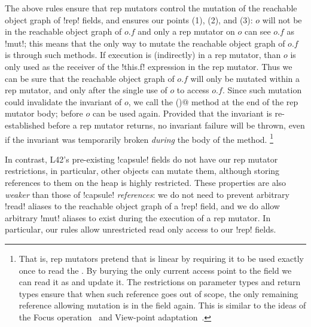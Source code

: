 	
\noindent The above rules ensure that rep mutators control the mutation of the reachable object graph of \Q!rep! fields, and 
 ensures our points (1), (2), and (3):
$o$ will not be in the reachable object graph of $o.f$ and
only a rep mutator on $o$ can see $o.f$ as \Q!mut!; this means that the only way to mutate the reachable object graph of $o.f$ is through such methods. 
If execution is (indirectly) in a rep mutator, than $o$ is only used as the receiver of the \Q!this.f! expression in the rep mutator.
Thus we can be sure that the reachable object graph of $o.f$ will only be mutated within a rep mutator, and only after the single use of $o$ to access $o.f$.
Since such mutation could invalidate the invariant of $o$, we call the \Q@invariant()@ method at the end of the rep mutator body; before $o$ can be used again. Provided that the invariant is re-established before a rep mutator returns, no invariant failure will be thrown, even if the invariant was temporarily broken \emph{during} the body of the method.
\footnote{
That is, rep mutators pretend
  that \Q@this@ is linear by requiring it to be used exactly once to read the \Q@rep@. By burying the
  only current access point to the \Q@rep@ field we can read it as \Q@mut@ and update it.
  The restrictions on parameter types and return types ensure that when such reference goes out of
  scope, the only remaining reference allowing mutation is in the \Q@rep@ field again.
  This is similar to the ideas of the Focus operation~\cite{DBLP:journals/jot/BarnettDFLS04}
 and View-point adaptation~\cite{DietlEtAl07}.
}

In contrast, L42's pre-existing \Q!capsule! fields do not have our rep mutator restrictions, in particular, other objects can mutate them, although storing references to them on the heap is highly restricted.
These properties are also \emph{weaker} than those of \Q!capsule! \emph{references}: we do not need to prevent arbitrary \Q!read! aliases to the reachable object graph of a \Q!rep! field, and we do allow arbitrary \Q!mut! aliases to exist during the execution of a rep mutator. In particular, our rules allow unrestricted read only access to our \Q!rep! fields.

